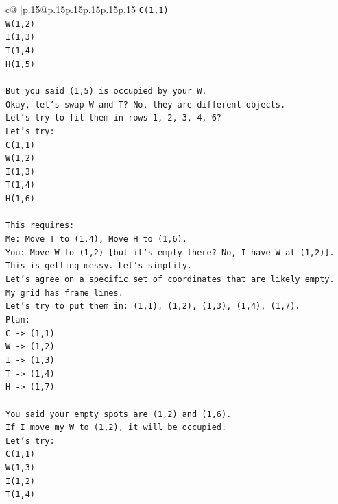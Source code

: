 \documentclass{article}
\begin{document}
{\begin{supertabular}{c@{$\;$}|p{.15\linewidth}@{}p{.15\linewidth}p{.15\linewidth}p{.15\linewidth}p{.15\linewidth}p{.15\linewidth}}
{{{\texttt{C(1,1)} \\
\texttt{W(1,2)} \\
\texttt{I(1,3)} \\
\texttt{T(1,4)} \\
\texttt{H(1,5)} \\
\\ 
\texttt{But you said (1,5) is occupied by your W.} \\
\texttt{Okay, let's swap W and T? No, they are different objects.} \\
\texttt{Let's try to fit them in rows 1, 2, 3, 4, 6?} \\
\texttt{Let's try:} \\
\texttt{C(1,1)} \\
\texttt{W(1,2)} \\
\texttt{I(1,3)} \\
\texttt{T(1,4)} \\
\texttt{H(1,6)} \\
\\ 
\texttt{This requires:} \\
\texttt{Me: Move T to (1,4), Move H to (1,6).} \\
\texttt{You: Move W to (1,2) {[}but it's empty there? No, I have W at (1,2){]}.} \\
\texttt{This is getting messy. Let's simplify.} \\
\texttt{Let's agree on a specific set of coordinates that are likely empty.} \\
\texttt{My grid has frame lines.} \\
\texttt{Let's try to put them in: (1,1), (1,2), (1,3), (1,4), (1,7).} \\
\texttt{Plan:} \\
\texttt{C {-}> (1,1)} \\
\texttt{W {-}> (1,2)} \\
\texttt{I {-}> (1,3)} \\
\texttt{T {-}> (1,4)} \\
\texttt{H {-}> (1,7)} \\
\\ 
\texttt{You said your empty spots are (1,2) and (1,6).} \\
\texttt{If I move my W to (1,2), it will be occupied.} \\
\texttt{Let's try:} \\
\texttt{C(1,1)} \\
\texttt{W(1,3)} \\
\texttt{I(1,2)} \\
\texttt{T(1,4)} \\
}}}
\end{supertabular}}
\end{document}
